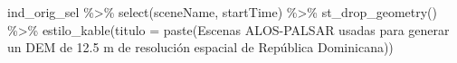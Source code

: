 \documentclass[spanish]{article}
\newenvironment{Shaded}{\begin{snugshade}}{\end{snugshade}}
\newcommand{\AttributeTok}[1]{\textcolor[rgb]{0.77,0.63,0.00}{#1}}
\newcommand{\FunctionTok}[1]{\textcolor[rgb]{0.00,0.00,0.00}{#1}}
\newcommand{\NormalTok}[1]{#1}
\newcommand{\SpecialCharTok}[1]{\textcolor[rgb]{0.00,0.00,0.00}{#1}}
\newcommand{\StringTok}[1]{\textcolor[rgb]{0.31,0.60,0.02}{#1}}
\begin{document}
\begin{Shaded}
\begin{Highlighting}[]
\NormalTok{ind\_orig\_sel }\SpecialCharTok{\%\textgreater{}\%} \FunctionTok{select}\NormalTok{(sceneName, startTime) }\SpecialCharTok{\%\textgreater{}\%} \FunctionTok{st\_drop\_geometry}\NormalTok{() }\SpecialCharTok{\%\textgreater{}\%}
  \FunctionTok{estilo\_kable}\NormalTok{(}\AttributeTok{titulo =} \FunctionTok{paste}\NormalTok{(}\StringTok{\textquotesingle{}Escenas ALOS{-}PALSAR usadas para generar un DEM de 12.5 m de}
\StringTok{                        resolución espacial de República Dominicana\textquotesingle{}}\NormalTok{))}
\end{Highlighting}
\end{Shaded}

\begin{table}[H]


\end{table}
\end{document}
